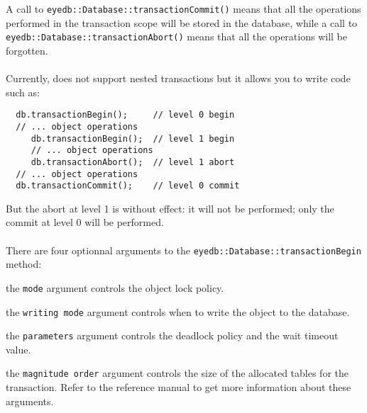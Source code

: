 \normalsize
A call to \texttt{eyedb::Database::transactionCommit()} means that all the
operations performed in the transaction scope will be stored in
the database, while a call to \texttt{eyedb::Database::transactionAbort()} means
that all the operations will be forgotten.
\\
\\
Currently, \eyedb does not support nested transactions but it allows you
to write code such as:
\verbsize
\begin{verbatim}
  db.transactionBegin();     // level 0 begin
  // ... object operations
     db.transactionBegin();  // level 1 begin
     // ... object operations
     db.transactionAbort();  // level 1 abort
  // ... object operations
  db.transactionCommit();    // level 0 commit
\end{verbatim}
\normalsize
But the abort at level 1 is without effect: it will
not be performed; only the commit at level 0 will be performed.
\\
\\
There are four optionnal arguments to the \texttt{eyedb::Database::transactionBegin}
method:
\be
\item the \texttt{mode} argument controls the object lock policy.
\item the \texttt{writing mode} argument controls when to write the object to
the database.
\item the \texttt{parameters} argument controls the deadlock policy and the
wait timeout value.
\item the \texttt{magnitude order} argument controls the size of the allocated
tables for the transaction.
\ee
Refer to the reference manual to get more information about these arguments.

